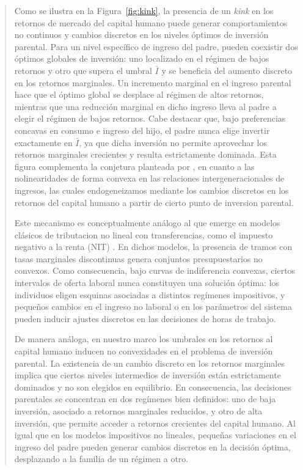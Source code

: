 \documentclass[12pt]{article}
\begin{document}
\begin{abstract}
Como se ilustra en la Figura~\ref{fig:kink}, la presencia de un \emph{kink} en los retornos de mercado del capital humano puede generar comportamientos no continuos y cambios discretos en los niveles óptimos de inversión parental. Para un nivel específico de ingreso del padre, pueden coexistir dos óptimos globales de inversión: uno localizado en el régimen de bajos retornos y otro que supera el umbral $\bar I$ y se beneficia del aumento discreto en los retornos marginales. Un incremento marginal en el ingreso parental hace que el óptimo global se desplace al régimen de altos retornos, mientras que una reducción marginal en dicho ingreso lleva al padre a elegir el régimen de bajos retornos. Cabe destacar que, bajo preferencias concavas en consumo e ingreso del hijo, el padre nunca elige invertir exactamente en $\bar I$, ya que dicha inversión no permite aprovechar los retornos marginales crecientes y resulta estrictamente dominada.
Esta figura complementa la conjetura planteada por \textcite{Bratsberg_2007}, en cuanto a las nolinearidades de forma convexa en las relaciones intergeneracionales de ingresos, las cuales endogeneizamos mediante los cambios discretos en los retornos del capital humano a partir de cierto punto de inversion parental.

Este mecanismo es conceptualmente análogo al que emerge en modelos clásicos de tributacion no lineal con transferencias, como el impuesto negativo a la renta (NIT) \parencite{Burtless_1978,Hausman_1985}. En dichos modelos, la presencia de tramos con tasas marginales discontinuas genera conjuntos presupuestarios no convexos. Como consecuencia, bajo curvas de indiferencia convexas, ciertos intervalos de oferta laboral nunca constituyen una solución óptima: los individuos eligen esquinas asociadas a distintos regímenes impositivos, y pequeños cambios en el ingreso no laboral o en los parámetros del sistema pueden inducir ajustes discretos en las decisiones de horas de trabajo.

De manera análoga, en nuestro marco los umbrales en los retornos al capital humano inducen no convexidades en el problema de inversión parental. La existencia de un cambio discreto en los retornos marginales implica que ciertos niveles intermedios de inversión están estrictamente dominados y no son elegidos en equilibrio. En consecuencia, las decisiones parentales se concentran en dos regímenes bien definidos: uno de baja inversión, asociado a retornos marginales reducidos, y otro de alta inversión, que permite acceder a retornos crecientes del capital humano. Al igual que en los modelos impositivos no lineales, pequeñas variaciones en el ingreso del padre pueden generar cambios discretos en la decisión óptima, desplazando a la familia de un régimen a otro.


\end{abstract}
\end{document}
